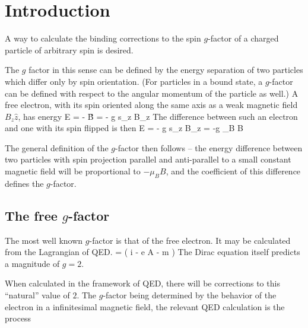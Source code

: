 
\chapter{Introduction}


A way to calculate the binding corrections to the spin $g$-factor of a charged particle of arbitrary spin is desired.


The $g$ factor in this sense can be defined by the energy separation of two particles which differ only by spin orientation.  (For particles in a bound state, a $g$-factor can be defined with respect to the angular momentum of the particle as well.)  A free electron, with its spin oriented along the same axis as a weak magnetic field $B_z\hat{z}$, has energy
\beq
 E = - \gv{\mu} \cdot \v{B} = - g s_z B_z
\eeq
The difference between such an electron and one with its spin flipped is then
\beq
	\delta E = - g s_z B_z = -g \mu_B B
\eeq


The general definition of the $g$-factor then follows -- the energy difference between two particles with spin projection parallel and anti-parallel to a small constant magnetic field will be proportional to $ - \mu_B B$, and the coefficient of this difference defines the $g$-factor.


\section{The free $g$-factor}
The most well known $g$-factor is that of the free electron.  It may be calculated from the Lagrangian of QED.
\beq
	 = \Psibar \left( i \partial \cdot \gamma - e A \cdot \gamma - m \right ) \Psi
\eeq
The Dirac equation itself predicts a magnitude of $g=2$.  

When calculated in the framework of QED, there will be corrections to this ``natural'' value of $2$.  The $g$-factor being determined by the behavior of the electron in a infinitesimal magnetic field, the relevant QED calculation is the process

